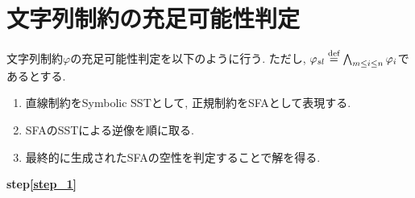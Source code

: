 \documentclass[uplatex,dvipdfmx,a4j]{jsreport}
\begin{document}
  \chapter{文字列制約の充足可能性判定} \label{chap:solve}

  文字列制約$\varphi$の充足可能性判定を以下のように行う.
  ただし, $\varphi_{sl} \overset{\scriptsize \mbox{def}}{=} \bigwedge_{m \leq i \le n} \varphi_i$であるとする.
  \begin{enumerate}
    \item 直線制約をSymbolic SSTとして, 正規制約をSFAとして表現する.  \label{step_1}
    \item SFAのSSTによる逆像を順に取る.                            \label{step_2}
    \item 最終的に生成されたSFAの空性を判定することで解を得る.         \label{step_3}
  \end{enumerate}
  {\bf step\ref{step_1}}
\end{document}
